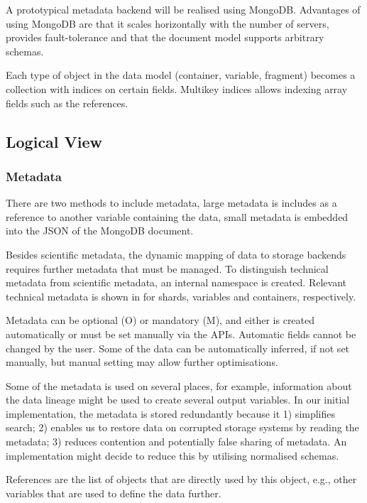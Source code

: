 
A prototypical metadata backend will be realised using MongoDB.
Advantages of using MongoDB are that it scales horizontally with the number of servers, provides fault-tolerance and that the document model supports arbitrary schemas.


Each type of object in the data model (container, variable, fragment) becomes a collection with indices on certain fields.
Multikey indices allows indexing array fields such as the references.



\subsection{Logical View}
\label{backend: mongo/logical}

\subsubsection{Metadata}

There are two methods to include metadata, large metadata is includes as a reference to another variable containing the data, small metadata is embedded into the JSON of the MongoDB document.

Besides scientific metadata, the dynamic mapping of data to storage backends requires further metadata that must be managed.
To distinguish technical metadata from scientific metadata, an internal namespace is created.
Relevant technical metadata is shown in  for shards, variables and containers, respectively.

Metadata can be optional (O) or mandatory (M), and either is created automatically or must be set manually via the APIs.
Automatic fields cannot be changed by the user.
Some of the data can be automatically inferred, if not set manually, but manual setting may allow further optimisations.

Some of the metadata is used on several places, for example, information about the data lineage might be used to create several output variables.
In our initial implementation, the metadata is stored redundantly because it
1) simplifies search; 2) enables us to restore data on corrupted storage systems by reading the metadata; 3) reduces contention and potentially false sharing of metadata.
An implementation might decide to reduce this by utilising normalised schemas.

References are the list of objects that are directly used by this object, e.g., other variables that are used to define the data further.

